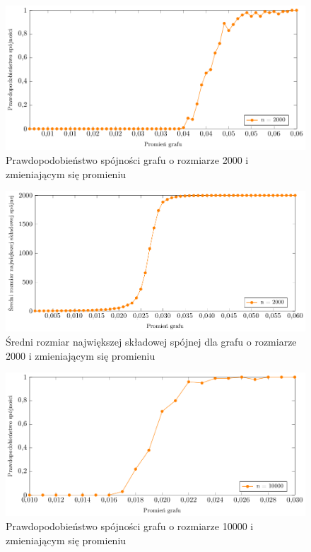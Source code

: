 		\begin{figure}
			\centering
			\includegraphics[scale=0.8]{2000-0_06_0-consistency_prob.pdf}
			\caption{Prawdopodobieństwo spójności grafu o rozmiarze 2000 i zmieniającym się promieniu}
			\label{2000-0_06_0-consistency_prob}
		\end{figure}

		\begin{figure}
			\centering
			\includegraphics[scale=0.8]{2000-0_06_0-max_comps_sizes_means.pdf}
			\caption{Średni rozmiar największej składowej spójnej dla grafu o rozmiarze 2000 i zmieniającym się promieniu}
			\label{2000-0_06_0-max_comps_sizes_means}
		\end{figure}

		\begin{figure}
			\centering
			\includegraphics[scale=0.8]{10000-0_0:3_0-consistency_prob.pdf}
			\caption{Prawdopodobieństwo spójności grafu o rozmiarze 10000 i zmieniającym się promieniu}
			\label{10000-0_0:3_0-consistency_prob}
		\end{figure}

